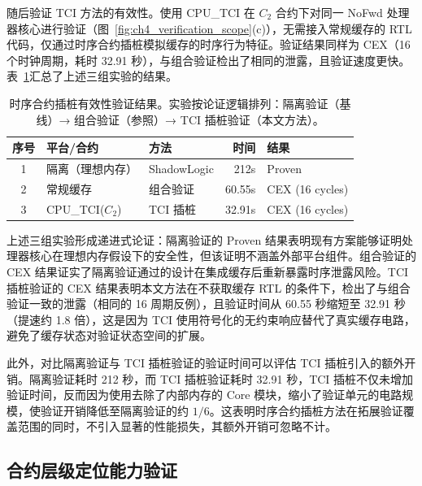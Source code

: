 随后验证 TCI 方法的有效性。使用 CPU\_TCI 在 $C_2$ 合约下对同一 NoFwd 处理器核心进行验证（图~\ref{fig:ch4_verification_scope}(c)），无需接入常规缓存的 RTL 代码，仅通过时序合约插桩模拟缓存的时序行为特征。验证结果同样为 CEX（16 个时钟周期，耗时 32.91 秒），与组合验证检出了相同的泄露，且验证速度更快。表~\ref{tab:ch4_tci_validity}汇总了上述三组实验的结果。

\begin{table}[htb]
    \centering
    \caption{时序合约插桩有效性验证结果。实验按论证逻辑排列：隔离验证（基线）→ 组合验证（参照）→ TCI 插桩验证（本文方法）。}
    \label{tab:ch4_tci_validity}
    \begin{tabular}{cllrl}
        \hline
        \textbf{序号} & \textbf{平台/合约} & \textbf{方法} & \textbf{时间} & \textbf{结果} \\
        \hline
        1 & 隔离（理想内存） & ShadowLogic & 212s & Proven \\
        2 & 常规缓存 & 组合验证 & 60.55s & CEX (16 cycles) \\
        3 & CPU\_TCI($C_2$) & TCI 插桩 & 32.91s & CEX (16 cycles) \\
        \hline
    \end{tabular}
\end{table}

上述三组实验形成递进式论证：隔离验证的 Proven 结果表明现有方案能够证明处理器核心在理想内存假设下的安全性，但该证明不涵盖外部平台组件。组合验证的 CEX 结果证实了隔离验证通过的设计在集成缓存后重新暴露时序泄露风险。TCI 插桩验证的 CEX 结果表明本文方法在不获取缓存 RTL 的条件下，检出了与组合验证一致的泄露（相同的 16 周期反例），且验证时间从 60.55 秒缩短至 32.91 秒（提速约 1.8 倍），这是因为 TCI 使用符号化的无约束响应替代了真实缓存电路，避免了缓存状态对验证状态空间的扩展。

此外，对比隔离验证与 TCI 插桩验证的验证时间可以评估 TCI 插桩引入的额外开销。隔离验证耗时 212 秒，而 TCI 插桩验证耗时 32.91 秒，TCI 插桩不仅未增加验证时间，反而因为使用去除了内部内存的 Core 模块，缩小了验证单元的电路规模，使验证开销降低至隔离验证的约 $1/6$。这表明时序合约插桩方法在拓展验证覆盖范围的同时，不引入显著的性能损失，其额外开销可忽略不计。

\subsection{合约层级定位能力验证}
\label{subsec:ch4_eval_locate}

